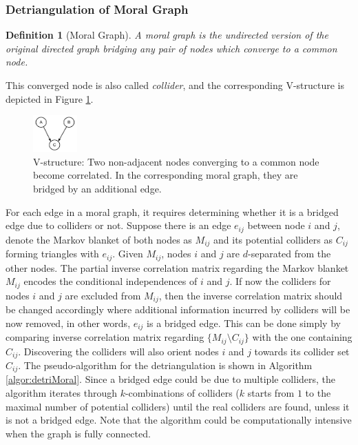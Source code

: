 \documentclass{article}
\newtheorem{definition}[theorem]{Definition}
\begin{document}
\subsubsection{Detriangulation of Moral Graph}
\begin{definition}[Moral Graph]
A moral graph is the undirected version of the original directed graph bridging any pair of nodes which converge to a common node. 
\end{definition}
This converged node is also called {\em collider}, and the corresponding V-structure is depicted in Figure \ref{fig:nonequivClass}.
\begin{center}
\begin{figure}[H]
		\begin{center}
			\includegraphics[width=0.15\textwidth]{Figures/nonequivalentClass}
		\end{center}
			\caption{V-structure: Two non-adjacent nodes converging to a common node become correlated. In the corresponding moral graph, they are bridged by an additional edge.}
					\label{fig:nonequivClass}
\end{figure}
\end{center}
  

For each edge in a moral graph, it requires determining whether it is a bridged edge due to colliders or not. Suppose there is an edge $e_{ij}$ between node $i$ and $j$, denote the Markov blanket of both nodes as $M_{ij}$ and its potential colliders as $C_{ij}$ forming triangles with $e_{ij}$. Given $M_{ij}$, nodes $i$ and $j$ are $d$-separated from the other nodes. The partial inverse correlation matrix regarding the Markov blanket $M_{ij}$ encodes the conditional independences of $i$ and $j$. If now the colliders for nodes $i$ and $j$ are excluded from $M_{ij}$, then the inverse correlation matrix should be changed accordingly where additional information incurred by colliders will be now removed, in other words, $e_{ij}$ is a bridged edge. This can be done simply by comparing inverse correlation matrix regarding $\lbrace M_{ij} \setminus C_{ij}\rbrace$ with the one containing $C_{ij}$. Discovering the colliders will also orient nodes $i$ and $j$ towards its collider set $C_{ij}$. The pseudo-algorithm for the detriangulation is shown in Algorithm \ref{algor:detriMoral}.
Since a bridged edge could be due to multiple colliders, the algorithm iterates through $k$-combinations of colliders ($k$ starts from $1$ to the maximal number of potential colliders) until the real colliders are found, unless it is not a bridged edge. Note that the algorithm could be computationally intensive when the graph is fully connected.
\end{document}
